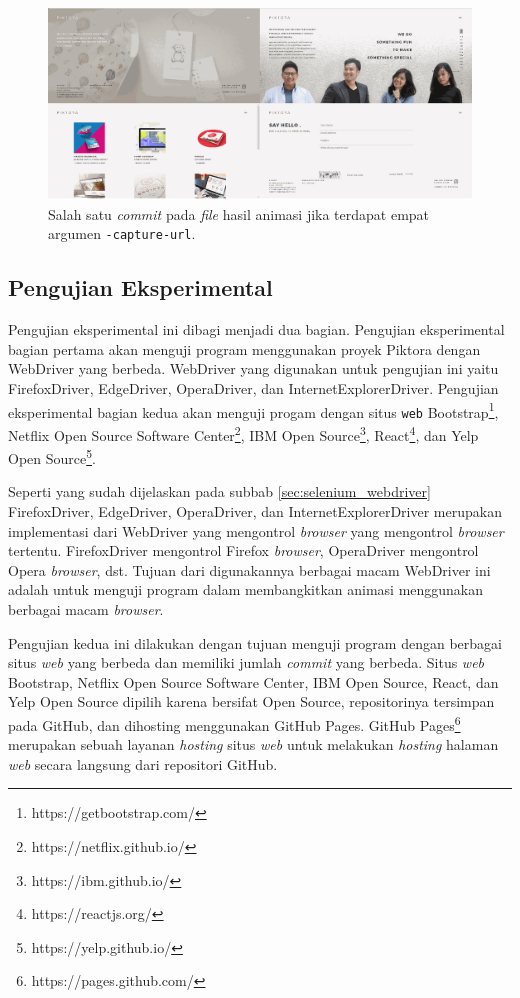 \begin{figure}[H]
	\centering
		\includegraphics[scale=0.3]{Gambar/capture4.png}
	\caption{Salah satu \textit{commit} pada \textit{file} hasil animasi jika terdapat empat argumen \texttt{-capture-url}.}
	\label{fig:capture4}
\end{figure}




\subsection{Pengujian Eksperimental}
\label{sec:pengujian_eksperimental} 
Pengujian eksperimental ini dibagi menjadi dua bagian. Pengujian eksperimental bagian pertama akan menguji program menggunakan proyek Piktora dengan WebDriver yang berbeda. WebDriver yang digunakan untuk pengujian ini yaitu FirefoxDriver, EdgeDriver, OperaDriver, dan InternetExplorerDriver. Pengujian eksperimental bagian kedua akan menguji progam dengan situs \texttt{web} Bootstrap\footnote{https://getbootstrap.com/}, Netflix Open Source Software Center\footnote{https://netflix.github.io/}, IBM Open Source\footnote{https://ibm.github.io/}, React\footnote{https://reactjs.org/}, dan Yelp Open Source\footnote{https://yelp.github.io/}. 

Seperti yang sudah dijelaskan pada subbab \ref{sec:selenium_webdriver} FirefoxDriver, EdgeDriver, OperaDriver, dan InternetExplorerDriver merupakan implementasi dari WebDriver yang mengontrol \textit{browser} yang mengontrol \textit{browser} tertentu. FirefoxDriver mengontrol Firefox \textit{browser}, OperaDriver mengontrol Opera \textit{browser}, dst. Tujuan dari digunakannya berbagai macam WebDriver ini adalah untuk menguji program dalam membangkitkan animasi menggunakan berbagai macam \textit{browser}.

Pengujian kedua ini dilakukan dengan tujuan menguji program dengan berbagai situs \textit{web} yang berbeda dan memiliki jumlah \textit{commit} yang berbeda. Situs \textit{web} Bootstrap, Netflix Open Source Software Center, IBM Open Source, React, dan Yelp Open Source  dipilih karena bersifat Open Source, repositorinya tersimpan pada GitHub, dan dihosting menggunakan GitHub Pages. GitHub Pages\footnote{https://pages.github.com/} merupakan sebuah layanan \textit{hosting} situs \textit{web} untuk melakukan \textit{hosting} halaman \textit{web} secara langsung dari repositori GitHub.     


